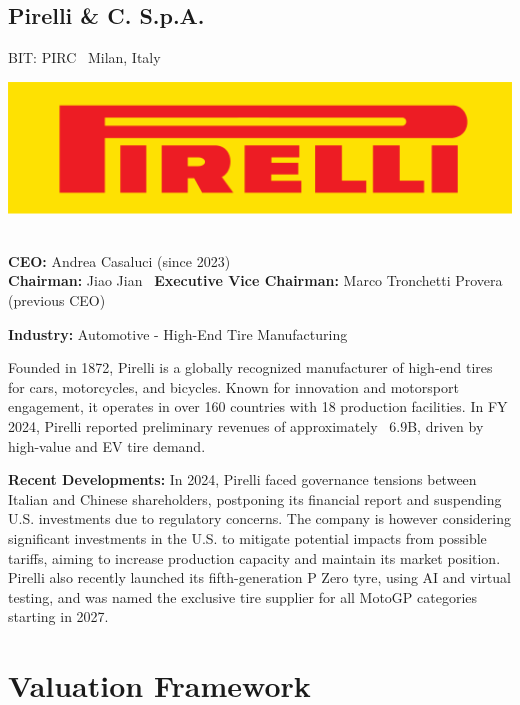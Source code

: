 \documentclass[12pt,a4paper]{report}
\begin{document}
\noindent
\begin{minipage}[t]{0.65\textwidth}
\section*{Pirelli \& C. S.p.A.}
BIT: PIRC \textbar\ Milan, Italy
\end{minipage}%
\hfill
\begin{minipage}[t]{0.30\textwidth}
  \vspace{-12pt}
  \includegraphics[width=\linewidth]{pirelli.png}
\end{minipage}\\

\textbf{CEO:} Andrea Casaluci (since 2023)\\
\textbf{Chairman:}  Jiao Jian \textbar\ \textbf{Executive Vice Chairman:} Marco Tronchetti Provera (previous CEO)

\textbf{Industry:} Automotive - High-End Tire Manufacturing

Founded in 1872, Pirelli is a globally recognized manufacturer of high-end tires for cars, motorcycles, and bicycles. Known for innovation and motorsport engagement, it operates in over 160 countries with 18 production facilities. In FY 2024, Pirelli reported preliminary revenues of approximately ~\texteuro6.9B, driven by high-value and EV tire demand.

\textbf{Recent Developments:}  In 2024, Pirelli faced governance tensions between Italian and Chinese shareholders, postponing its financial report and suspending U.S. investments due to regulatory concerns.  The company is however considering significant investments in the U.S. to mitigate potential impacts from possible tariffs, aiming to increase production capacity and maintain its market position. Pirelli also recently launched its fifth-generation P Zero tyre, using AI and virtual testing, and was named the exclusive tire supplier for all MotoGP categories starting in 2027.\\


\chapter{Valuation Framework}
\end{document}
